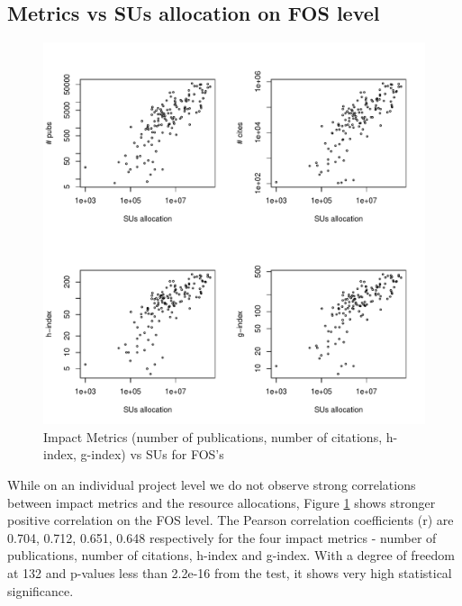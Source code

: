 \documentclass{tex/sig-alternate}
\begin{document}
\subsection{Metrics vs SUs allocation on FOS level} 
 
\begin{figure}[!htb] 
  \centering 
    \includegraphics[width=1.0\columnwidth]{images/03_metrics_vs_alloc_fos.pdf} 
  \caption{Impact Metrics (number of publications, number of citations, h-index, g-index) vs SUs for FOS's}\label{F:metrics-vs-alloc-fos} 
\end{figure} 

While on an individual project level we do not observe strong correlations between impact metrics and the resource allocations, Figure \ref {F:metrics-vs-alloc-fos} shows stronger positive correlation on the FOS level. The Pearson correlation coefficients (r) are 0.704, 0.712, 0.651, 0.648 respectively for the four impact metrics - number of publications, number of citations, h-index and g-index. With a degree of freedom at 132 and p-values less than 2.2e-16 from the test, it shows very high statistical significance.  
 
\end{document}
